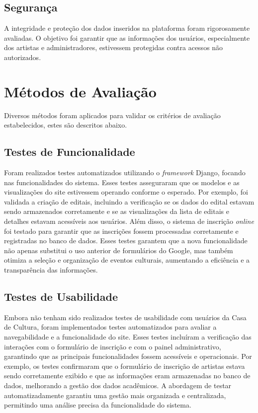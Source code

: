 \subsection{Segurança} 
A integridade e proteção dos dados inseridos na plataforma foram rigorosamente avaliadas. O objetivo foi garantir que as informações dos usuários, especialmente dos artistas e administradores, estivessem protegidas contra acessos não autorizados.

\section{Métodos de Avaliação}

Diversos métodos foram aplicados para validar os critérios de avaliação estabelecidos, estes são descritos abaixo.

\subsection{Testes de Funcionalidade} 

Foram realizados testes automatizados utilizando o \textit{framework} Django, focando nas funcionalidades do sistema. Esses testes asseguraram que os modelos e as visualizações do site estivessem operando conforme o esperado. Por exemplo, foi validada a criação de editais, incluindo a verificação se os dados do edital estavam sendo armazenados corretamente e se as visualizações da lista de editais e detalhes estavam acessíveis aos usuários. Além disso, o sistema de inscrição \textit{online} foi testado para garantir que as inscrições fossem processadas corretamente e registradas no banco de dados. Esses testes garantem que a nova funcionalidade não apenas substitui o uso anterior de formulários do Google, mas também otimiza a seleção e organização de eventos culturais, aumentando a eficiência e a transparência das informações.

\subsection{Testes de Usabilidade}

Embora não tenham sido realizados testes de usabilidade com usuários da Casa de Cultura, foram implementados testes automatizados para avaliar a navegabilidade e a funcionalidade do site. Esses testes incluíram a verificação das interações com o formulário de inscrição e com o painel administrativo, garantindo que as principais funcionalidades fossem acessíveis e operacionais. Por exemplo, os testes confirmaram que o formulário de inscrição de artistas estava sendo corretamente exibido e que as informações eram armazenadas no banco de dados, melhorando a gestão dos dados acadêmicos. A abordagem de testar automatizadamente garantiu uma gestão mais organizada e centralizada, permitindo uma análise precisa da funcionalidade do sistema.

